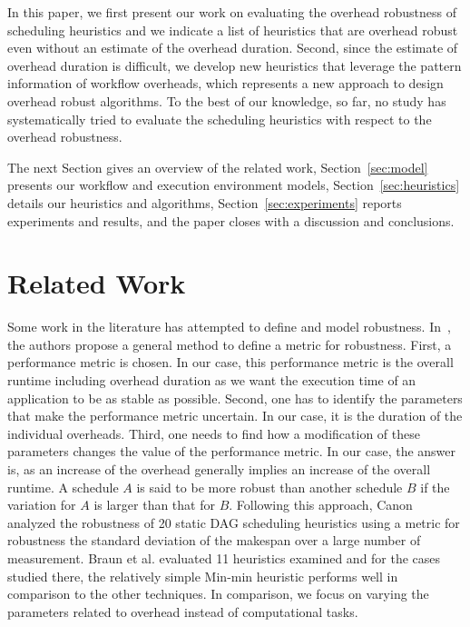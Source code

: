 \documentclass[final,5p,times,twocolumn]{elsarticle}
\begin{document}
In this paper, we first present our work on evaluating the overhead robustness of scheduling heuristics and we indicate a list of heuristics that are overhead robust even without an estimate of the overhead duration. Second, since the estimate of overhead duration is difficult, we develop new heuristics that leverage the pattern information of workflow overheads, which represents a new approach to design overhead robust algorithms. To the best of our knowledge, so far, no study has systematically tried to evaluate the scheduling heuristics with respect to the overhead robustness.  

The next Section gives an overview of the related work, Section~\ref{sec:model} presents our workflow and execution environment models, Section~\ref{sec:heuristics} details our heuristics and algorithms, Section~\ref{sec:experiments} reports experiments and results, and the paper closes with a discussion and conclusions.



\section{Related Work}

Some work in the literature has attempted to define and model robustness. In~\cite{Ali2004}, the authors propose a general method to define a metric for robustness. First, a performance metric is chosen. In our case, this performance metric is the overall runtime including overhead duration as we want the execution time of an application to be as stable as possible. Second, one has to identify the parameters that make the performance metric uncertain. In our case, it is the duration of the individual overheads. Third, one needs to find how a modification of these parameters changes the value of the performance metric. In our case, the answer is, as an increase of the overhead generally implies an increase of the overall runtime. 
A schedule $A$ is said to be more robust than another schedule $B$ if the variation for $A$ is larger than that for $B$.
Following this approach, Canon~\cite{Canon2008} analyzed the robustness of 20 static DAG scheduling heuristics using a metric for robustness the standard deviation of the makespan over a large number of measurement. Braun et al. \cite{Braun2001} evaluated 11 heuristics examined and for the cases studied there, the relatively simple Min-min heuristic performs well in comparison to the other techniques. In comparison, we focus on varying the parameters related to overhead instead of computational tasks. 
\end{document}
